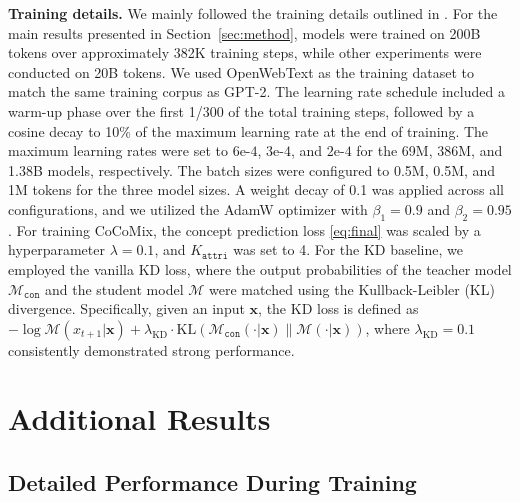 \documentclass[]{fairmeta}
\def\rvx{{\mathbf{x}}}
\newcommand{\sname}{CoCoMix\xspace}
\begin{document}
\textbf{Training details.} 
We mainly followed the training details outlined in \citep{brown2020language}. For the main results presented in Section~\ref{sec:method}, models were trained on 200B tokens over approximately 382K training steps, while other experiments were conducted on 20B tokens. We used OpenWebText as the training dataset to match the same training corpus as GPT-2. The learning rate schedule included a warm-up phase over the first 1/300 of the total training steps, followed by a cosine decay to 10\% of the maximum learning rate at the end of training. The maximum learning rates were set to $6\text{e-}4$, $3\text{e-}4$, and $2\text{e-}4$ for the 69M, 386M, and 1.38B models, respectively. The batch sizes were configured to 0.5M, 0.5M, and 1M tokens for the three model sizes. A weight decay of 0.1 was applied across all configurations, and we utilized the AdamW optimizer \citep{loshchilov2017decoupled} with $\beta_1 = 0.9$ and $\beta_2 = 0.95$. For training \sname, the concept prediction loss \autoref{eq:final} was scaled by a hyperparameter $\lambda = 0.1$, and $K_{\mathtt{attri}}$ was set to 4. For the KD baseline, we employed the vanilla KD loss, where the output probabilities of the teacher model $\mathcal{M}_{\mathtt{con}}$ and the student model $\mathcal{M}$ were matched using the Kullback-Leibler (KL) divergence. Specifically, given an input $\rvx$, the KD loss is defined as $-\log \mathcal{M}(x_{t+1}|\rvx) + \lambda_\text{KD} \cdot \mathrm{KL}(\mathcal{M}_{\mathtt{con}}(\cdot|\rvx) \| \mathcal{M}(\cdot|\rvx))$, where $\lambda_\text{KD}=0.1$ consistently demonstrated strong performance.

\section{Additional Results}

\subsection{Detailed Performance During Training}
\end{document}
